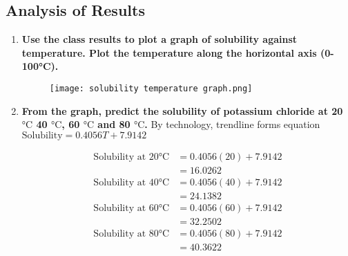 	\subsection{Analysis of Results}
		\begin{enumerate}
			\item \textbf{Use the class results to plot a graph of solubility against temperature. Plot the temperature along the horizontal axis (0-100°C).}
			\begin{figure}[H]
				\centering
				\texttt{[image: solubility temperature graph.png]}
			\end{figure}
			\item \textbf{From the graph, predict the solubility of potassium chloride at 20 $\unit{\degreeCelsius}$ 40 $\unit{\degreeCelsius}$, 60 $\unit{\degreeCelsius}$ and 80 $\unit{\degreeCelsius}$.}
				\subitem By technology, trendline forms equation $\text{Solubility} = 0.4056T + 7.9142$

				\begin{align*}
					\text{Solubility at 20} \unit{\degreeCelsius} &= 0.4056(20) + 7.9142 \\
					&= 16.0262
				\end{align*}
				\begin{align*}
					\text{Solubility at 40} \unit{\degreeCelsius} &= 0.4056(40) + 7.9142 \\
					&= 24.1382
				\end{align*}
				\begin{align*}
					\text{Solubility at 60} \unit{\degreeCelsius} &= 0.4056(60) + 7.9142 \\
					&= 32.2502
				\end{align*}
				\begin{align*}
					\text{Solubility at 80} \unit{\degreeCelsius} &= 0.4056(80) + 7.9142 \\
					&= 40.3622
				\end{align*}
		\end{enumerate}

	\newpage

